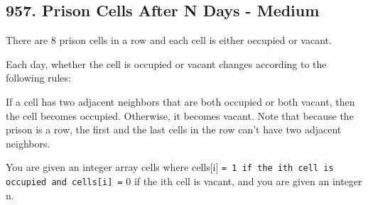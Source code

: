 \documentclass[9pt, b5paper]{article}
\begin{document}
\subsection{957. Prison Cells After N Days - Medium}
\label{sec-2-9}
There are 8 prison cells in a row and each cell is either occupied or vacant.

Each day, whether the cell is occupied or vacant changes according to the following rules:

If a cell has two adjacent neighbors that are both occupied or both vacant, then the cell becomes occupied.
Otherwise, it becomes vacant.
Note that because the prison is a row, the first and the last cells in the row can't have two adjacent neighbors.

You are given an integer array cells where cells[i] \texttt{= 1 if the ith cell is occupied and cells[i] =} 0 if the ith cell is vacant, and you are given an integer n.
\end{document}
